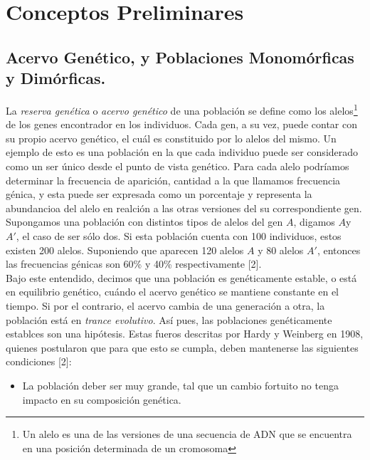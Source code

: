 \documentclass[letterpaper]{article}
\begin{document}
    \section{Conceptos Preliminares}{

        \subsection{Acervo Genético, y Poblaciones Monomórficas y Dimórficas.}{

            \normalsize{La \textit{reserva genética} o \textit{acervo genético} de una población se define como los alelos\footnote{Un alelo es una de las versiones de una secuencia de ADN que se encuentra en una posición determinada de un cromosoma} de los genes encontrador en los individuos. Cada gen, a su vez, puede contar con su propio acervo genético, el cuál es constituido por lo alelos del mismo. Un ejemplo de esto es una población en la que cada individuo puede ser considerado como un ser único desde el punto de vista genético. Para cada alelo podríamos determinar la frecuencia de aparición, cantidad a la que llamamos frecuencia génica, y esta puede ser expresada como un porcentaje y representa la abundancioa del alelo en realción a las otras versiones del su correspondiente gen. Supongamos una población con distintos tipos de alelos del gen $A$, digamos $A$y $A'$, el caso de ser sólo dos. Si esta población cuenta con 100 individuos, estos existen 200 alelos. Suponiendo que aparecen 120 alelos $A$ y 80 alelos $A'$, entonces las frecuencias génicas son 60\% y 40\% respectivamente [2].}\\

            \normalsize{Bajo este entendido, decimos que una población es genéticamente estable, o está en equilibrio genético, cuándo el acervo genético se mantiene constante en el tiempo. Si por el contrario, el acervo cambia de una generación a otra, la población está en \textit{trance evolutivo}. Así pues, las poblaciones genéticamente establces son una hipótesis. Estas fueros descritas por Hardy y Weinberg en 1908, quienes postularon que para que esto se cumpla, deben mantenerse las siguientes condiciones [2]:}

            \begin{itemize}
                \item {

                    \normalsize{La población deber ser muy grande, tal que un cambio fortuito no tenga impacto en su composición genética.}
                
}
\end{itemize}}}
\end{document}
